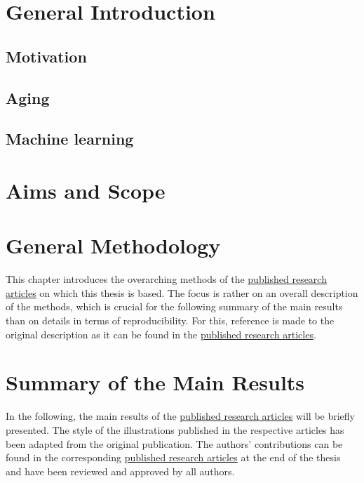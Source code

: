 \documentclass[oneside]{book}
\begin{document}

    \chapter{General Introduction}\label{chap:intro}
    
        \section{Motivation}
        \label{motivation}
        
        
    
        \section{Aging}
        \label{theory:aging}
            
        
        \section{Machine learning}
        \label{theory:ml}
         

    \chapter{Aims and Scope}
    \label{chap:aims_scope}
    

    \chapter{General Methodology}
    \label{chap:methods}
    This chapter introduces the overarching methods of the \hyperref[pub:papers]{published research articles} on which this thesis is based. The focus is rather on an overall description of the methods, which is crucial for the following summary of the main results than on details in terms of reproducibility. For this, reference is made to the original description as it can be found in the \hyperref[pub:papers]{published research articles}.
    
    
    \chapter{Summary of the Main Results}
    \label{chap:results}
    In the following, the main results of the \hyperref[pub:papers]{published research articles} will be briefly presented. The style of the illustrations published in the respective articles has been adapted from the original publication. The authors' contributions can be found in the corresponding \hyperref[pub:papers]{published research articles} at the end of the thesis and have been reviewed and approved by all authors.
    
\end{document}
